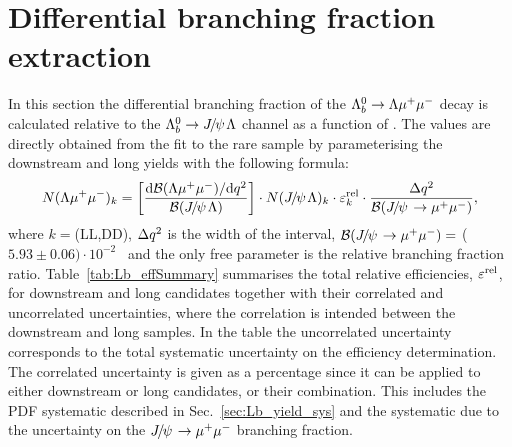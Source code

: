 \section{Differential branching fraction extraction}
\label{sec:Lb_BRsummary}

In this section the differential branching fraction of the $\Lambda^0_b\rightarrow\Lambda\mu^+\mu^-$ decay is calculated 
relative to the $\Lb\ra\jpsi\Lz$ channel as a function of \qsq.
The values are directly obtained from the fit to the rare sample by parameterising
the downstream and long yields with the following formula:
%
\begin{equation}
N(\Lz\mumu)_{k}  = \left[ \frac{\mathrm{d}\mathcal{B}(\Lz\mumu)/\mathrm{d}\qsq}{\mathcal{B}(\jpsi\Lz)} \right]  \cdot
N(\jpsi\Lz)_{k} \cdot \varepsilon^{\mathrm{rel}}_{k} \cdot \frac {\Delta\qsq} { \mathcal{B}(\jpsi\to\mumu) },
\label{eq:ield_from_BR}
\end{equation}
\noindent
where $k = $(LL,DD), $\Delta q^2$ is the width of the \qsq interval, 
\mbox{$\mathcal{B}(\jpsi\to\mumu) =$} ($5.93 \pm 0.06)\cdot 10^{-2}$~\cite{PDG2014} and the only free parameter
is the relative branching fraction ratio. Table~\ref{tab:Lb_effSummary} summarises the total relative efficiencies, 
$\varepsilon^{\rm rel}$, for downstream and long candidates together with their correlated and uncorrelated uncertainties, 
where the correlation is intended between the downstream and long samples. In the table the uncorrelated uncertainty 
corresponds to the total systematic uncertainty on the efficiency determination.
The correlated uncertainty is given as a percentage since it can be applied to either downstream or long candidates,  
or their combination. This includes the PDF systematic described in Sec.~\ref{sec:Lb_yield_sys} and the systematic 
due to the uncertainty on the $\jpsi\to\mumu$ branching fraction.

